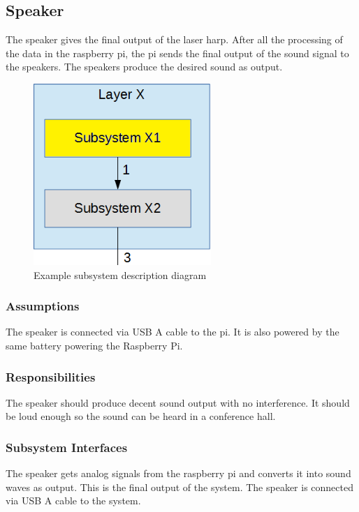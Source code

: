 \subsection{Speaker}
The speaker gives the final output of the laser harp. After all the processing of the data in the raspberry pi, the pi sends the final output of the sound signal to the speakers. The speakers produce the desired sound as output. 

\begin{figure}[h!]
	\centering
 	\includegraphics[width=0.60\textwidth]{images/subsystem}
 \caption{Example subsystem description diagram}
\end{figure}

\subsubsection{Assumptions}
The speaker is connected via USB A cable to the pi. It is also powered by the same battery powering the Raspberry Pi.

\subsubsection{Responsibilities}
The speaker should produce decent sound output with no interference. It should be loud enough so the sound can be heard in a conference hall. 

\subsubsection{Subsystem Interfaces}
The speaker gets analog signals from the raspberry pi and converts it into sound waves as output. This is the final output of the system. The speaker is connected via USB A cable to the system.

